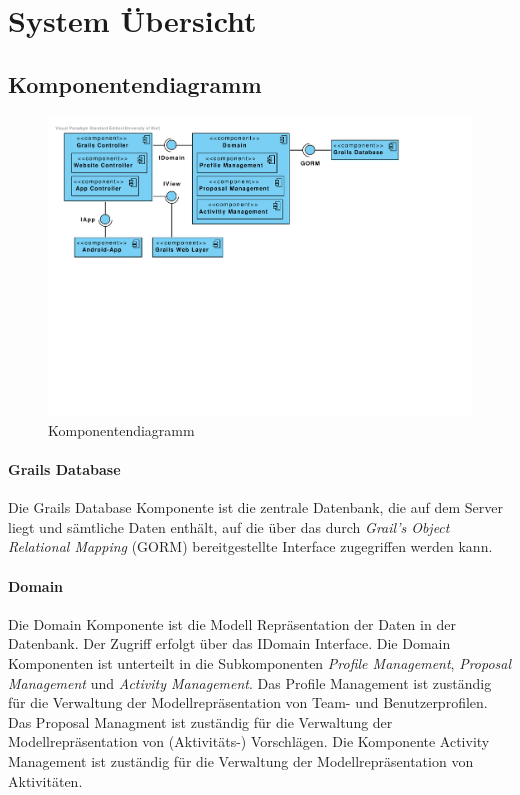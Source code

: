 \section{System \"Ubersicht}

\subsection{Komponentendiagramm}

\begin{figure}[H]
  \centering
  \includegraphics[width=\textwidth, trim=1cm 11cm 4cm 1cm, clip]{gfx/component_diagram}
  \caption{Komponentendiagramm}
\end{figure}

\paragraph{Grails Database} Die Grails Database Komponente ist die
zentrale Datenbank, die auf dem Server liegt und s\"amtliche Daten
enth\"alt, auf die \"uber das durch \emph{Grail's Object
  Relational Mapping} (GORM) bereitgestellte Interface zugegriffen werden kann.

\paragraph{Domain} Die Domain Komponente ist die Modell
Repr\"asentation der Daten in der Datenbank. Der Zugriff erfolgt
\"uber das IDomain Interface. Die Domain Komponenten ist unterteilt in
die Subkomponenten \emph{Profile Management}, \emph{Proposal
  Management} und \emph{Activity Management}. Das Profile Management
ist zuständig für die Verwaltung der Modellrepräsentation von Team-
und Benutzerprofilen. Das Proposal Managment ist zuständig für die
Verwaltung der Modellrepräsentation von (Aktivitäts-) Vorschlägen. Die
Komponente Activity Management ist zuständig für die Verwaltung der Modellrepräsentation von Aktivitäten.

